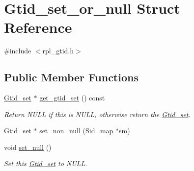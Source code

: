 \hypertarget{structGtid__set__or__null}{}\section{Gtid\+\_\+set\+\_\+or\+\_\+null Struct Reference}
\label{structGtid__set__or__null}


{\ttfamily \#include $<$rpl\+\_\+gtid.\+h$>$}

\subsection*{Public Member Functions}
\begin{DoxyCompactItemize}
\item 
\mbox{\label{structGtid__set__or__null_af7b6ce07b4c3ed0a49af673fc8340172}} 
\mbox{\hyperlink{classGtid__set}{Gtid\+\_\+set}} $\ast$ \mbox{\hyperlink{structGtid__set__or__null_af7b6ce07b4c3ed0a49af673fc8340172}{get\+\_\+gtid\+\_\+set}} () const
\begin{DoxyCompactList}\small\item\em Return N\+U\+LL if this is N\+U\+LL, otherwise return the \mbox{\hyperlink{classGtid__set}{Gtid\+\_\+set}}. \end{DoxyCompactList}\item 
\mbox{\hyperlink{classGtid__set}{Gtid\+\_\+set}} $\ast$ \mbox{\hyperlink{structGtid__set__or__null_a3a7015e462a30aad90c33e58c99a68c4}{set\+\_\+non\+\_\+null}} (\mbox{\hyperlink{classSid__map}{Sid\+\_\+map}} $\ast$sm)
\item 
\mbox{\label{structGtid__set__or__null_ac47966d9a50008b0d6cf067f48d224ab}} 
void \mbox{\hyperlink{structGtid__set__or__null_ac47966d9a50008b0d6cf067f48d224ab}{set\+\_\+null}} ()
\begin{DoxyCompactList}\small\item\em Set this \mbox{\hyperlink{classGtid__set}{Gtid\+\_\+set}} to N\+U\+LL. \end{DoxyCompactList}\end{DoxyCompactItemize}
